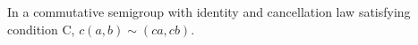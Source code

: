 In a commutative semigroup with identity and cancellation law satisfying condition C, $c(a, b) \sim (ca, cb)$.

